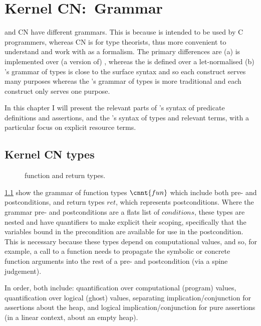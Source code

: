 \chapter{Kernel CN:\ Grammar}%
\label{chap:kernel-grammar}

\margintoc%

 and  CN have different grammars. This is because  is
intended to be used by C programmers, whereas  CN is for type
theorists, thus more convenient to understand and work with as a formalism. The
primary differences are (a)  is implemented over (a version of)
, whereas the  is defined over a let-normalised
 (b) 's grammar of types is close to the surface syntax and
so each construct serves many purposes whereas the 's grammar of types
is more traditional and each construct only serves one purpose.

In this chapter I will present the relevant parts of 's syntax of
predicate definitions and assertions, and the 's syntax of types and
relevant terms, with a particular focus on explicit resource terms.

\section{Kernel CN types}

\begin{figure}
    \small
    \grammartabularSTY{
        \cnfon{}\cninterrule{}
        \cnret{}\cnafterlastrule{}
    }
    \caption{ function and return types.}\label{fig:kernel-fun-ret}
\end{figure}

\cref{fig:kernel-fun-ret} show the grammar of function types $\cnnt{fun}$ which
include both pre- and postconditions, and return types ${ret}$, which
represents postconditions. Where the  grammar pre- and postconditions
are a flats list of ${conditions}$, these types are nested and have quantifiers
to make explicit their scoping, specifically that the variables bound in the
precondition are available for use in the postcondition. This is necessary
because these types depend on computational values, and so, for example, a call
to a function needs to propagate the symbolic or concrete function arguments
into the rest of a pre- and postcondition (via a spine judgement).

In order, both include: quantification over computational (program) values,
quantification over logical (ghost) values, separating implication/conjunction
for assertions about the heap, and logical implication/conjunction for pure
assertions (in a linear context, about an empty heap).

